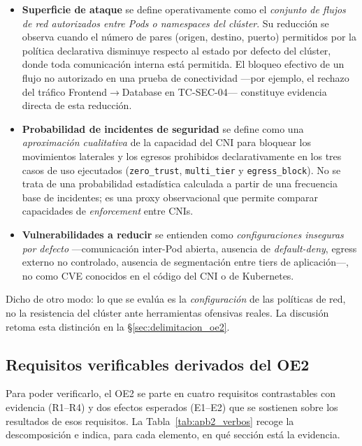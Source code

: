 \begin{itemize}
    \item \textbf{Superficie de ataque} se define operativamente como el \emph{conjunto de flujos de red autorizados entre Pods o namespaces del clúster}. Su reducción se observa cuando el número de pares (origen, destino, puerto) permitidos por la política declarativa disminuye respecto al estado por defecto del clúster, donde toda comunicación interna está permitida. El bloqueo efectivo de un flujo no autorizado en una prueba de conectividad ---por ejemplo, el rechazo del tráfico Frontend$\rightarrow$Database en TC-SEC-04--- constituye evidencia directa de esta reducción.

    \item \textbf{Probabilidad de incidentes de seguridad} se define como una \emph{aproximación cualitativa} de la capacidad del CNI para bloquear los movimientos laterales y los egresos prohibidos declarativamente en los tres casos de uso ejecutados (\texttt{zero\_trust}, \texttt{multi\_tier} y \texttt{egress\_block}). No se trata de una probabilidad estadística calculada a partir de una frecuencia base de incidentes; es una proxy observacional que permite comparar capacidades de \emph{enforcement} entre CNIs.

    \item \textbf{Vulnerabilidades a reducir} se entienden como \emph{configuraciones inseguras por defecto} ---comunicación inter-Pod abierta, ausencia de \emph{default-deny}, egress externo no controlado, ausencia de segmentación entre tiers de aplicación---, no como CVE conocidos en el código del CNI o de Kubernetes.
\end{itemize}

Dicho de otro modo: lo que se evalúa es la \emph{configuración} de las políticas de red, no la resistencia del clúster ante herramientas ofensivas reales. La discusión retoma esta distinción en la \S\ref{sec:delimitacion_oe2}.

\subsection{Requisitos verificables derivados del OE2} \label{sec:apb2_verbos}

Para poder verificarlo, el OE2 se parte en cuatro requisitos contrastables con evidencia (R1--R4) y dos efectos esperados (E1--E2) que se sostienen sobre los resultados de esos requisitos. La Tabla~\ref{tab:apb2_verbos} recoge la descomposición e indica, para cada elemento, en qué sección está la evidencia.

